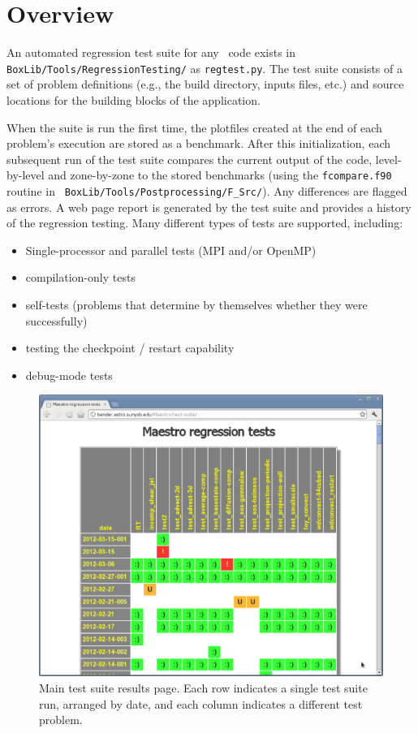 \section{Overview}

An automated regression test suite for any \boxlib\ code
exists in {\tt BoxLib/Tools/RegressionTesting/} as {\tt regtest.py}.
The test suite consists of a set of problem definitions (e.g., the
build directory, inputs files, etc.) and source locations for the
building blocks of the application.

When the suite is run the first time, the plotfiles created at the end
of each problem's execution are stored as a benchmark.  After this
initialization, each subsequent run of the test suite compares the
current output of the code, level-by-level and zone-by-zone to the
stored benchmarks (using the {\tt fcompare.f90} routine in {\tt
  BoxLib/Tools/Postprocessing/F\_Src/}).  Any differences are flagged as errors.
A web page report is generated by the test suite and provides a
history of the regression testing.  Many different types of tests
are supported, including:
\begin{itemize}
\item Single-processor and parallel tests (MPI and/or OpenMP)
\item compilation-only tests
\item self-tests (problems that determine by themselves whether they were successfully)
\item testing the checkpoint / restart capability
\item debug-mode tests
\end{itemize}

\begin{figure}[t]
\centering
\includegraphics[width=5.0in]{testsuite}
\caption{\label{fig:test_suite_main} Main test suite results page.  Each 
row indicates a single test suite run, arranged by date, and each column
indicates a different test problem. }
\end{figure}


